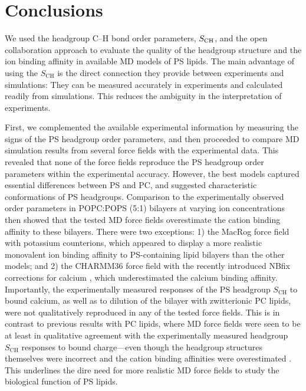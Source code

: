 \documentclass[journal=jpcbfk,manuscript=article]{achemso}
\begin{document}
\section{Conclusions}

We used the headgroup C--H bond order parameters, $S_{\rm CH}$, and the open collaboration approach to evaluate the quality
of the headgroup structure and the ion binding affinity 
in available MD models of PS lipids.
The main advantage of using the $S_\mathrm{CH}$ is the direct connection they provide
between experiments and simulations: They can be measured accurately in experiments and calculated readily from simulations. 
This reduces the ambiguity in the interpretation of experiments.

First, we complemented the available experimental information \cite{browning80,roux90} by measuring the signs of the PS headgroup order parameters,
and then proceeded to compare MD simulation results from several force fields with the experimental data.
This revealed that none of the force fields
reproduce the PS headgroup order parameters within the experimental accuracy.
However, the best models captured essential differences between PS and PC, and
suggested characteristic conformations of PS headgroups.
Comparison to the experimentally observed order parameters in POPC:POPS (5:1) bilayers  at varying ion
concentrations \cite{roux90} then showed that the tested MD force fields
overestimate the cation binding affinity to these bilayers. There were two exceptions: 1) the MacRog force field with potassium counterions, which appeared to display a more realistic monovalent ion binding
affinity to PS-containing lipid bilayers than the other models; and 2) the CHARMM36 force field with the recently introduced
NBfix corrections for calcium \cite{kim16,han2018graph}, which underestimated the calcium binding affinity.
Importantly, the experimentally measured responses of the PS headgroup $S_\mathrm{CH}$ to bound calcium, as well as to dilution of the bilayer with zwitterionic PC lipids, were not
qualitatively reproduced in any of the tested force fields.
This is in contrast to previous results with PC lipids,
where MD force fields were seen to be at least in qualitative agreement with the experimentally measured headgroup $S_\mathrm{CH}$ responses to bound charge---even
though the headgroup structures themselves were
incorrect and the cation binding affinities were overestimated \cite{catte16}.
This underlines the dire need for more realistic MD force fields to study the biological function of PS lipids.
\end{document}
